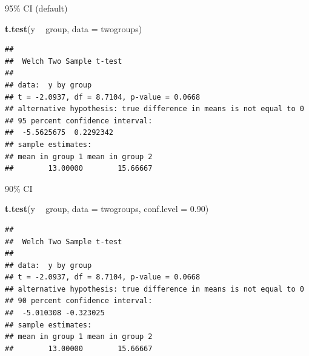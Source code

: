 \documentclass[
  ignorenonframetext,
]{beamer}
\newenvironment{Shaded}{\begin{snugshade}}{\end{snugshade}}
\newcommand{\DataTypeTok}[1]{\textcolor[rgb]{0.13,0.29,0.53}{#1}}
\newcommand{\FloatTok}[1]{\textcolor[rgb]{0.00,0.00,0.81}{#1}}
\newcommand{\KeywordTok}[1]{\textcolor[rgb]{0.13,0.29,0.53}{\textbf{#1}}}
\newcommand{\NormalTok}[1]{#1}
\newcommand{\OperatorTok}[1]{\textcolor[rgb]{0.81,0.36,0.00}{\textbf{#1}}}
\newcommand{\StringTok}[1]{\textcolor[rgb]{0.31,0.60,0.02}{#1}}
\begin{document}
\begin{frame}[fragile]{95\% CI (default)}
\protect\hypertarget{ci-default}{}

\begin{Shaded}
\begin{Highlighting}[]
\KeywordTok{t.test}\NormalTok{(y }\OperatorTok{~}\StringTok{ }\NormalTok{group, }\DataTypeTok{data =}\NormalTok{ twogroups)}
\end{Highlighting}
\end{Shaded}

\begin{verbatim}
## 
##  Welch Two Sample t-test
## 
## data:  y by group
## t = -2.0937, df = 8.7104, p-value = 0.0668
## alternative hypothesis: true difference in means is not equal to 0
## 95 percent confidence interval:
##  -5.5625675  0.2292342
## sample estimates:
## mean in group 1 mean in group 2 
##        13.00000        15.66667
\end{verbatim}

\end{frame}

\begin{frame}[fragile]{90\% CI}
\protect\hypertarget{ci}{}

\begin{Shaded}
\begin{Highlighting}[]
\KeywordTok{t.test}\NormalTok{(y }\OperatorTok{~}\StringTok{ }\NormalTok{group, }\DataTypeTok{data =}\NormalTok{ twogroups, }\DataTypeTok{conf.level =} \FloatTok{0.90}\NormalTok{)}
\end{Highlighting}
\end{Shaded}

\begin{verbatim}
## 
##  Welch Two Sample t-test
## 
## data:  y by group
## t = -2.0937, df = 8.7104, p-value = 0.0668
## alternative hypothesis: true difference in means is not equal to 0
## 90 percent confidence interval:
##  -5.010308 -0.323025
## sample estimates:
## mean in group 1 mean in group 2 
##        13.00000        15.66667
\end{verbatim}

\end{frame}
\end{document}
